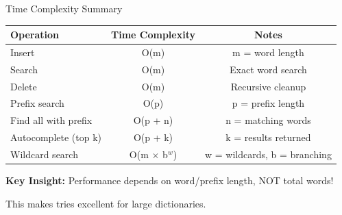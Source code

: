\documentclass[aspectratio=169]{beamer}
\begin{document}
\begin{frame}{Time Complexity Summary}
  \begin{table}
    \centering
    \begin{tabular}{|l|c|c|}
      \hline
      \textbf{Operation} & \textbf{Time Complexity} & \textbf{Notes} \\
      \hline
      Insert & O(m) & m = word length \\
      \hline
      Search & O(m) & Exact word search \\
      \hline
      Delete & O(m) & Recursive cleanup \\
      \hline
      Prefix search & O(p) & p = prefix length \\
      \hline
      Find all with prefix & O(p + n) & n = matching words \\
      \hline
      Autocomplete (top k) & O(p + k) & k = results returned \\
      \hline
      Wildcard search & O(m $\times$ b$^w$) & w = wildcards, b = branching \\
      \hline
    \end{tabular}
  \end{table}

  \vspace{0.5cm}
  \textbf{Key Insight:} Performance depends on word/prefix length, NOT total words!

  This makes tries excellent for large dictionaries.
\end{frame}
\end{document}
